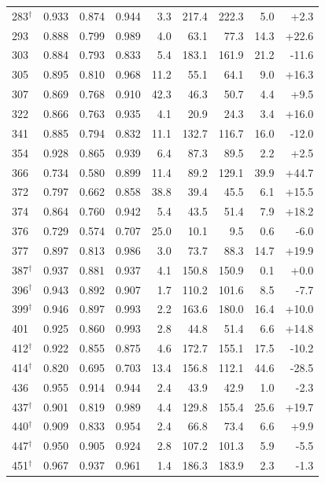 {\begin{tabular}{@{}lrrrrrrrr@{}}
283$^\dagger$ & 0.933 & 0.874 & 0.944 & 3.3 & 217.4 & 222.3 & 5.0 & +2.3 \\
293 & 0.888 & 0.799 & 0.989 & 4.0 & 63.1 & 77.3 & 14.3 & +22.6 \\
303 & 0.884 & 0.793 & 0.833 & 5.4 & 183.1 & 161.9 & 21.2 & -11.6 \\
305 & 0.895 & 0.810 & 0.968 & 11.2 & 55.1 & 64.1 & 9.0 & +16.3 \\
307 & 0.869 & 0.768 & 0.910 & 42.3 & 46.3 & 50.7 & 4.4 & +9.5 \\
322 & 0.866 & 0.763 & 0.935 & 4.1 & 20.9 & 24.3 & 3.4 & +16.0 \\
341 & 0.885 & 0.794 & 0.832 & 11.1 & 132.7 & 116.7 & 16.0 & -12.0 \\
354 & 0.928 & 0.865 & 0.939 & 6.4 & 87.3 & 89.5 & 2.2 & +2.5 \\
366 & 0.734 & 0.580 & 0.899 & 11.4 & 89.2 & 129.1 & 39.9 & +44.7 \\
372 & 0.797 & 0.662 & 0.858 & 38.8 & 39.4 & 45.5 & 6.1 & +15.5 \\
374 & 0.864 & 0.760 & 0.942 & 5.4 & 43.5 & 51.4 & 7.9 & +18.2 \\
376 & 0.729 & 0.574 & 0.707 & 25.0 & 10.1 & 9.5 & 0.6 & -6.0 \\
377 & 0.897 & 0.813 & 0.986 & 3.0 & 73.7 & 88.3 & 14.7 & +19.9 \\
387$^\dagger$ & 0.937 & 0.881 & 0.937 & 4.1 & 150.8 & 150.9 & 0.1 & +0.0 \\
396$^\dagger$ & 0.943 & 0.892 & 0.907 & 1.7 & 110.2 & 101.6 & 8.5 & -7.7 \\
399$^\dagger$ & 0.946 & 0.897 & 0.993 & 2.2 & 163.6 & 180.0 & 16.4 & +10.0 \\
401 & 0.925 & 0.860 & 0.993 & 2.8 & 44.8 & 51.4 & 6.6 & +14.8 \\
412$^\dagger$ & 0.922 & 0.855 & 0.875 & 4.6 & 172.7 & 155.1 & 17.5 & -10.2 \\
414$^\dagger$ & 0.820 & 0.695 & 0.703 & 13.4 & 156.8 & 112.1 & 44.6 & -28.5 \\
436 & 0.955 & 0.914 & 0.944 & 2.4 & 43.9 & 42.9 & 1.0 & -2.3 \\
437$^\dagger$ & 0.901 & 0.819 & 0.989 & 4.4 & 129.8 & 155.4 & 25.6 & +19.7 \\
440$^\dagger$ & 0.909 & 0.833 & 0.954 & 2.4 & 66.8 & 73.4 & 6.6 & +9.9 \\
447$^\dagger$ & 0.950 & 0.905 & 0.924 & 2.8 & 107.2 & 101.3 & 5.9 & -5.5 \\
451$^\dagger$ & 0.967 & 0.937 & 0.961 & 1.4 & 186.3 & 183.9 & 2.3 & -1.3 \\

\end{tabular}}
